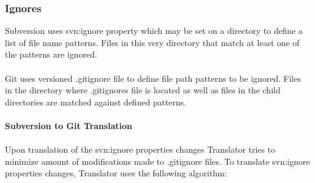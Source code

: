 \subsubsection{Ignores}
Subversion uses svn:ignore property which may be set on a directory to define a list of
file name patterns. Files in this very directory that match at least one of the patterns are ignored.
\\\\
Git uses versioned .gitignore file to define file path patterns to be ignored. Files in the directory
where .gitignores file is located as well as files in the child directories are matched against defined patterns.
\\\\
\textbf{Subversion to Git Translation}
\\\\
Upon translation of the svn:ignore properties changes Translator tries to minimize amount of modifications
made to .gitignore files. To translate svn:ignore properties changes, Translator uses the following algorithm:

